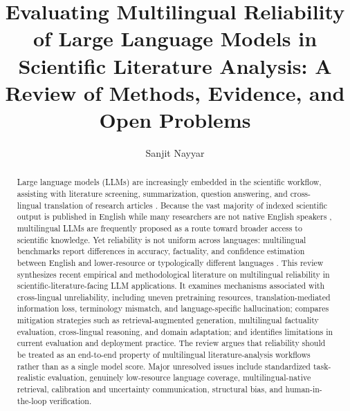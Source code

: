 \documentclass[acmsmall,nonacm]{acmart}
\begin{document}
\title{Evaluating Multilingual Reliability of Large Language Models in Scientific Literature Analysis: A Review of Methods, Evidence, and Open Problems}

\author{Sanjit Nayyar}
\authorsaddresses{}

\begin{abstract}
Large language models (LLMs) are increasingly embedded in the scientific workflow, assisting with literature screening, summarization, question answering, and cross-lingual translation of research articles \cite{Scherbakov2025,Kleidermacher2025}. Because the vast majority of indexed scientific output is published in English while many researchers are not native English speakers \cite{Kleidermacher2025,Amano2023}, multilingual LLMs are frequently proposed as a route toward broader access to scientific knowledge. Yet reliability is not uniform across languages: multilingual benchmarks report differences in accuracy, factuality, and confidence estimation between English and lower-resource or typologically different languages \cite{Xuan2025,Xue2024,GarcíaFerrero2024}. This review synthesizes recent empirical and methodological literature on multilingual reliability in scientific-literature-facing LLM applications. It examines mechanisms associated with cross-lingual unreliability, including uneven pretraining resources, translation-mediated information loss, terminology mismatch, and language-specific hallucination; compares mitigation strategies such as retrieval-augmented generation, multilingual factuality evaluation, cross-lingual reasoning, and domain adaptation; and identifies limitations in current evaluation and deployment practice. The review argues that reliability should be treated as an end-to-end property of multilingual literature-analysis workflows rather than as a single model score. Major unresolved issues include standardized task-realistic evaluation, genuinely low-resource language coverage, multilingual-native retrieval, calibration and uncertainty communication, structural bias, and human-in-the-loop verification.
\end{abstract}

\maketitle
\end{document}
